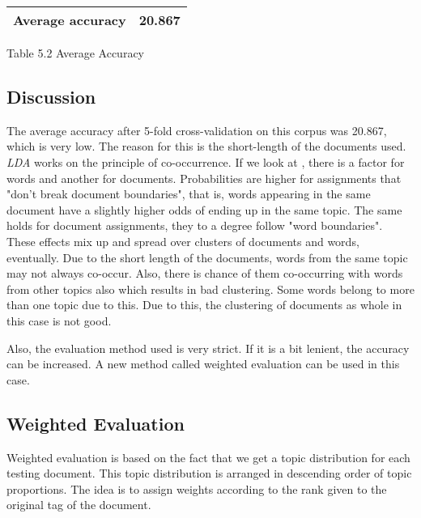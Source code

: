 \begin{center}
\begin{tabular}{ |c|c| }
  \hline
  Average accuracy & 20.867 \\ \hline
\end{tabular}
\end{center}
\begin{center}
 Table 5.2 Average Accuracy 
\end{center}

\subsection*{Discussion}

\par
The average accuracy after 5-fold cross-validation on this corpus was 20.867, which is very low. The reason for this is the short-length
of the documents used. \textit{LDA} works on the principle of co-occurrence. If we look at , there is a
factor for words and another for documents. Probabilities are higher for assignments that "don't break document boundaries", that is, words 
appearing in the same document have a slightly higher odds of ending up in the same topic. The same holds for document assignments, they to 
a degree follow "word boundaries". These effects mix up and spread over clusters of documents and words, eventually. Due to the short length 
of the documents, words from the same topic may not always co-occur. Also, there is chance of them co-occurring with words from other topics 
also which results in bad clustering. Some words belong to more than one topic due to this. Due to this, the clustering of documents as whole 
in this case is not good. 

\par
Also, the evaluation method used is very strict. If it is a bit lenient, the accuracy can be increased. A new method
called weighted evaluation can be used in this case.

\subsection*{Weighted Evaluation}

Weighted evaluation is based on the fact that we get a topic distribution for each testing document. This topic distribution is arranged
in descending order of topic proportions. The idea is to assign weights according to the rank given to the original tag of the document. 

